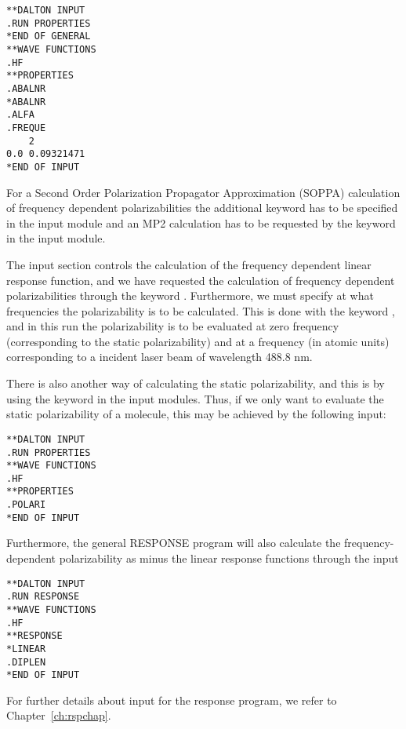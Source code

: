 \begin{verbatim}
**DALTON INPUT
.RUN PROPERTIES
*END OF GENERAL
**WAVE FUNCTIONS
.HF
**PROPERTIES
.ABALNR
*ABALNR
.ALFA
.FREQUE
    2
0.0 0.09321471
*END OF INPUT
\end{verbatim}

For a Second Order Polarization Propagator Approximation (SOPPA)
\cite{esnpjjodjcp73,jopjdycpr2,mjpekdtehjajjojcp,ekdspasjpca102} calculation 
of frequency
dependent polarizabilities the additional keyword  has to be 
specified in the  input module and an MP2 calculation has to 
be requested by the keyword  in the  input 
module.   

The  input section controls the calculation of the
frequency dependent linear response
function,
and we have requested the calculation of frequency dependent
polarizabilities through
the keyword .
Furthermore, we must specify at what frequencies the polarizability is
to be calculated. This is done with the keyword , and in
this run the polarizability is to be evaluated at zero frequency
(corresponding to the static polarizability) and at a frequency (in
atomic units) corresponding to a incident laser beam of wavelength
488.8 nm.

There is also another way of calculating the static
 polarizability, and this is by using the
keyword  in the  input modules. Thus, if we only
want to evaluate the static polarizability of a molecule, this may be
achieved by the following input:

\begin{verbatim}
**DALTON INPUT
.RUN PROPERTIES
**WAVE FUNCTIONS
.HF 
**PROPERTIES
.POLARI
*END OF INPUT
\end{verbatim}

Furthermore, the general RESPONSE program will also calculate the
frequency-dependent polarizability
as minus the linear response functions through the input


\begin{verbatim}
**DALTON INPUT
.RUN RESPONSE
**WAVE FUNCTIONS
.HF
**RESPONSE
*LINEAR
.DIPLEN
*END OF INPUT
\end{verbatim}
For further details about input for the response program, we refer
to Chapter~\ref{ch:rspchap}.
